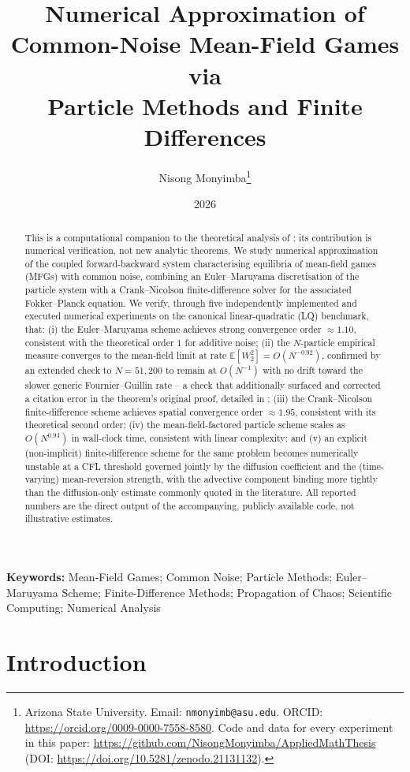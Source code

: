 \documentclass[11pt]{article}
\title{Numerical Approximation of Common-Noise Mean-Field Games via\\
Particle Methods and Finite Differences}
\author{Nisong Monyimba\thanks{Arizona State University. Email: \texttt{nmonyimb@asu.edu}. ORCID: \url{https://orcid.org/0009-0000-7558-8580}. Code and data for every experiment in this paper: \url{https://github.com/NisongMonyimba/AppliedMathThesis} (DOI: \url{https://doi.org/10.5281/zenodo.21131132}).}}
\date{2026}
\theoremstyle{remark}
\begin{document}
\maketitle

\begin{abstract}
This is a computational companion to the theoretical analysis of
\citet{monyimba2026paper1,monyimba2026thesis}: its contribution is numerical
verification, not new analytic theorems. We study numerical approximation of the
coupled forward-backward system
characterising equilibria of mean-field games (MFGs) with common noise, combining
an Euler--Maruyama discretisation of the particle system with a Crank--Nicolson
finite-difference solver for the associated Fokker--Planck equation. We verify,
through five independently implemented and executed numerical experiments on the
canonical linear-quadratic (LQ) benchmark, that: (i) the Euler--Maruyama scheme
achieves strong convergence order $\approx 1.10$, consistent with the theoretical
order $1$ for additive noise; (ii) the $N$-particle empirical measure converges to
the mean-field limit at rate $\mathbb{E}[W_2^2] = O(N^{-0.92})$, confirmed by an
extended check to $N=51{,}200$ to remain at $O(N^{-1})$ with no drift toward the
slower generic Fournier--Guillin rate -- a check that additionally surfaced and
corrected a citation error in the theorem's original proof, detailed in
; (iii) the Crank--Nicolson
finite-difference scheme achieves spatial convergence order $\approx 1.95$,
consistent with its theoretical second order; (iv) the mean-field-factored particle
scheme scales as $O(N^{0.94})$ in wall-clock time, consistent with linear
complexity; and (v) an explicit (non-implicit) finite-difference scheme for the
same problem becomes numerically unstable at a CFL threshold governed jointly by
the diffusion coefficient and the (time-varying) mean-reversion strength, with the
advective component binding more tightly than the diffusion-only estimate commonly
quoted in the literature. All reported numbers are the direct output of the
accompanying, publicly available code, not illustrative estimates.
\end{abstract}

\noindent\textbf{Keywords:} Mean-Field Games; Common Noise; Particle Methods; Euler--Maruyama Scheme;
Finite-Difference Methods; Propagation of Chaos; Scientific Computing; Numerical Analysis

\section{Introduction}
\label{sec:intro}
\end{document}
